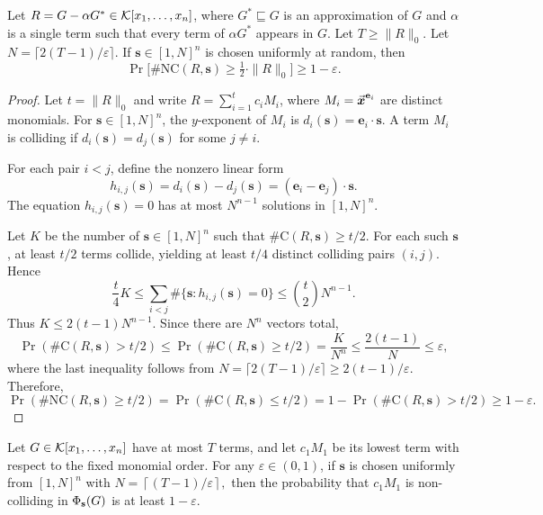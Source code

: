\documentclass{article}
\numberwithin{equation}{section}
\begin{document}
\begin{lemma}[Condition 2]\label{lem:half}
Let $R = G - \alpha G^* \in {\mathcal{K}}[x_1,\ldots,x_n]$, where $G^* \sqsubseteq G$ is an approximation of $G$ and $\alpha$ is a single term such that every term of $\alpha G^*$ appears in $G$. Let $T \ge \|R\|_0$.  
Let $N = \lceil 2(T-1) / \varepsilon \rceil$.  
If $\mathbf{s} \in [1,N]^n$ is chosen uniformly at random, then  
\[
\Pr\bigl[ \# \mathrm{NC}(R,\mathbf{s}) \ge \tfrac12 \cdot \|R\|_0 \bigr] \ge 1 - \varepsilon.
\]
\end{lemma}

\begin{proof}
Let $t = \|R\|_0$ and write $R = \sum_{i=1}^t c_i M_i$, where $M_i = \vec{\boldsymbol{x}}^{\mathbf{e}_i}$ are distinct monomials. For $\mathbf{s} \in [1,N]^n$, the $y$-exponent of $M_i$ is $d_i(\mathbf{s}) = \mathbf{e}_i \cdot \mathbf{s}$. A term $M_i$ is colliding if $d_i(\mathbf{s}) = d_j(\mathbf{s})$ for some $j \neq i$.

For each pair $i < j$, define the nonzero linear form
\[
h_{i,j}(\mathbf{s}) = d_i(\mathbf{s}) - d_j(\mathbf{s}) = (\mathbf{e}_i - \mathbf{e}_j) \cdot \mathbf{s}.
\]
The equation $h_{i,j}(\mathbf{s}) = 0$ has at most $N^{n-1}$ solutions in $[1,N]^n$.

Let $K$ be the number of $\mathbf{s} \in [1,N]^n$ such that $\#\mathrm{C}(R,\mathbf{s}) \ge t/2$. For each such $\mathbf{s}$, at least $t/2$ terms collide, yielding at least $t/4$ distinct colliding pairs $(i,j)$. Hence
\[
\frac{t}{4} K \le \sum_{i<j} \#\{\mathbf{s} : h_{i,j}(\mathbf{s}) = 0\}
\le \binom{t}{2} N^{n-1}.
\]
Thus $K \le 2(t-1)N^{n-1}$. Since there are $N^n$ vectors total,
\[
\Pr(\#\mathrm{C}(R,\mathbf{s}) > t/2)\le \Pr(\#\mathrm{C}(R,\mathbf{s}) \ge t/2) = \frac{K}{N^n}
\le \frac{2(t-1)}{N}
\le \varepsilon,
\]
where the last inequality follows from $N = \lceil 2(T-1)/\varepsilon \rceil \ge 2(t-1)/\varepsilon$. Therefore,
\[
\Pr(\#\mathrm{NC}(R,\mathbf{s}) \ge t/2)=\Pr(\#\mathrm{C}(R,\mathbf{s}) \le t/2)
= 1 - \Pr(\#\mathrm{C}(R,\mathbf{s}) > t/2)
\ge 1 - \varepsilon.
\]
\end{proof}

\begin{lemma}[Condition 3]\label{lem:lowest}
Let $G \in {\mathcal{K}}[x_1, \dots, x_n]$ have at most $T$ terms, and let $c_1 M_1$ be its lowest term with respect to the fixed monomial order. For any $\varepsilon \in (0,1)$, if $\mathbf{s}$ is chosen uniformly from $[1, N]^n$ with
%
$N = \left\lceil (T-1)/\varepsilon \right\rceil,$
%
then the probability that $c_1 M_1$ is non-colliding in $\Phi_{\mathbf{s}}(G)$ is at least $1 - \varepsilon$.
\end{lemma}
\end{document}
